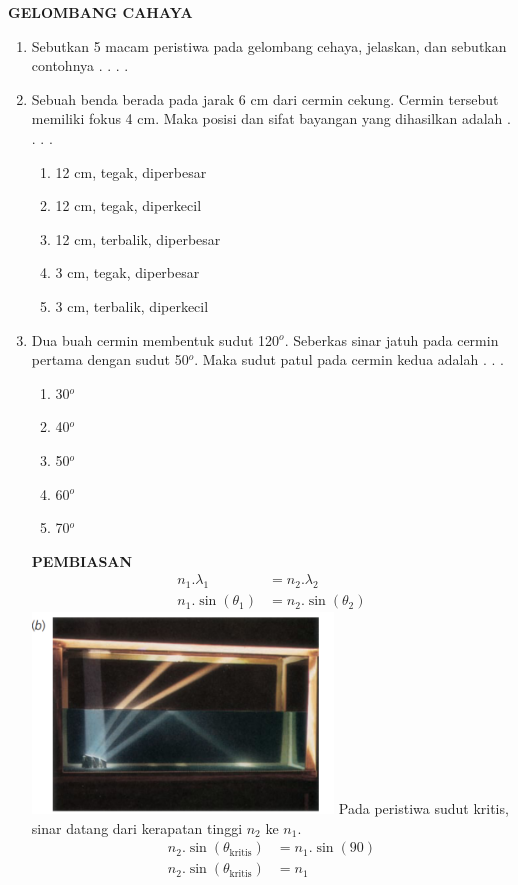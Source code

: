 \documentclass[11pt,a4paper]{extarticle}
\newcommand*\pilgan[1]{
\begin{enumerate}[label=\Alph*., itemsep=0pt,topsep=0pt,leftmargin=*,align=Center] #1 
\end{enumerate}}
\newcommand{\pilgani}[1]{                            \vspace{-0.3cm}\begin{multicols}{2}
 \begin{enumerate}[label=\Alph*., itemsep=0pt,topsep=0pt,leftmargin=*,align=Center]#1                     \end{enumerate}
 \phantom{ini cuma sapi, wedus, dan ayam}
 \end{multicols}}
\begin{document}
 \textbf{GELOMBANG CAHAYA} \phantom{ini nama siswa yang aaamengerjakan soal kuis ini }  

\begin{multicols*}{2}

\begin{enumerate}
\item Sebutkan 5 macam peristiwa pada gelombang cehaya, jelaskan, dan sebutkan contohnya . . . .

\vspace{3cm}

\item Sebuah benda berada pada jarak 6 cm dari cermin cekung. Cermin tersebut memiliki fokus 4 cm. Maka posisi dan sifat bayangan yang dihasilkan adalah . . . .
\pilgan{
        \item 12 cm, tegak, diperbesar
        \item 12 cm, tegak, diperkecil
        \item 12 cm, terbalik, diperbesar
        \item 3 cm, tegak, diperbesar
        \item 3 cm, terbalik, diperkecil
        }

\item Dua buah cermin membentuk sudut 120$^o$. Seberkas sinar jatuh pada cermin pertama dengan sudut 50$^o$. Maka sudut patul pada cermin kedua adalah . . . 
\pilgani{
        \item 30$^o$
        \item 40$^o$
        \item 50$^o$
        \item 60$^o$
        \item 70$^o$
        }

\vspace{3cm}

\textbf{PEMBIASAN}
\begin{align*}
n_1.\lambda_1 &= n_2.\lambda_2 \\
n_1.\sin(\theta_1) &=n_2.\sin(\theta_2)
\end{align*}
\includegraphics[width=8cm]{pic/kritis}
Pada peristiwa sudut kritis, sinar datang dari kerapatan tinggi $n_2$ ke $n_1$.
\begin{align*}
n_2.\sin(\theta_{\text{kritis}}) &=n_1.\sin(90)\\
n_2.\sin(\theta_{\text{kritis}}) &=n_1
\end{align*}



\end{enumerate}
\end{multicols*}
\end{document}
